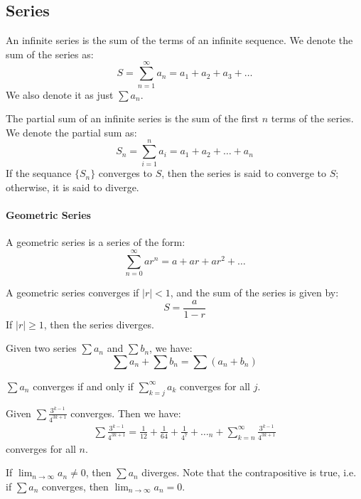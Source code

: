 \documentclass[11pt]{report}
\begin{document}
\subsection{Series}
\begin{definition}
    An infinite series is the sum of the terms of an infinite sequence. We denote the sum of the series as:
    \begin{equation}
        S = \sum_{n=1}^{\infty} a_n = a_1 + a_2 + a_3 + \ldots
    \end{equation}
    We also denote it as just $\sum a_n$.
\end{definition}
\begin{definition}
    The partial sum of an infinite series is the sum of the first $n$ terms of the series. We denote the partial sum as:
    \begin{equation}
        S_n = \sum_{i=1}^{n} a_i = a_1 + a_2 + \ldots + a_n
    \end{equation}
    If the sequance $\{S_n\}$ converges to $S$, then the series is said to converge to $S$; otherwise, it is said to diverge.
\end{definition}
\paragraph{Geometric Series} A geometric series is a series of the form:
\begin{equation}
    \sum_{n=0}^{\infty} ar^n = a + ar + ar^2 + \ldots
\end{equation}
\begin{theorem}
    A geometric series converges if $|r| < 1$, and the sum of the series is given by:
    \begin{equation}
        S = \frac{a}{1 - r}
    \end{equation}
    If $|r| \ge 1$, then the series diverges.
\end{theorem}
\begin{theorem}
    Given two series $\sum a_n$ and $\sum b_n$, we have:
    \begin{equation}
        \sum a_n + \sum b_n = \sum (a_n + b_n)
    \end{equation}
\end{theorem}
\begin{theorem}[Convergence]
    $\sum a_n$ converges if and only if $\sum_{k=j}^{\infty} a_k$ converges for all $j$.
\end{theorem}
\begin{example}
    Given $\sum \frac{3^{k-1}}{4^{3k+1}}$ converges. Then we have:
    \begin{align*}
        \sum \frac{3^{k-1}}{4^{3k+1}} = \frac{1}{12} + \frac{1}{64} + \frac{1}{4^7} + \ldots_n + \sum^{\infty}_{k=n} \frac{3^{k-1}}{4^{3k+1}}
    \end{align*}
    converges for all $n$.
\end{example}
\begin{theorem}
    If $\lim_{n \to \infty} a_n \ne 0$, then $\sum a_n$ diverges. Note that the contrapositive is true, i.e. if $\sum a_n$ converges, then $\lim_{n \to \infty} a_n = 0$.
\end{theorem}
\end{document}
